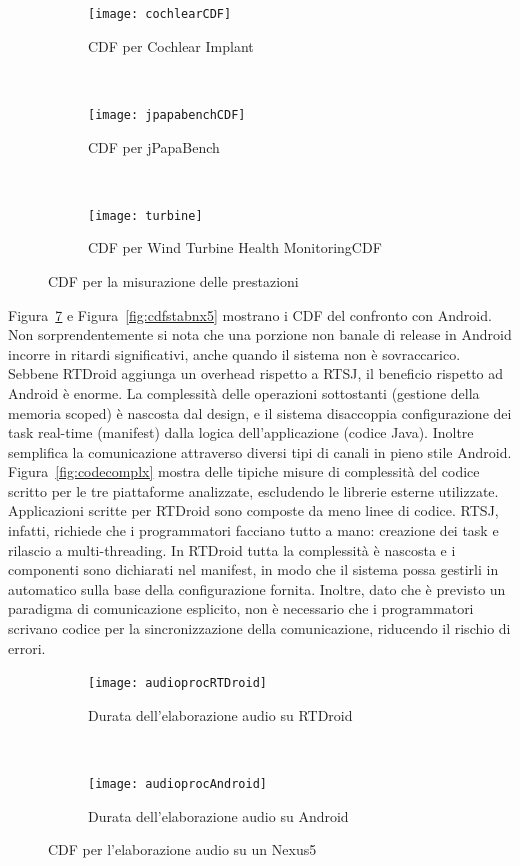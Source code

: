 \begin{figure}[h]
	\centering
	\begin{subfigure}[b]{0.3\textwidth}
		\texttt{[image: cochlearCDF]}
		\caption{CDF per Cochlear Implant}
		\label{fig:cochlearcdf}
	\end{subfigure}
	~ 
	\begin{subfigure}[b]{0.3\textwidth}
		\texttt{[image: jpapabenchCDF]}
		\caption{CDF per jPapaBench}
		\label{fig:jpapabenchcdf}
	\end{subfigure}
	~
	\begin{subfigure}[b]{0.3\textwidth}
		\texttt{[image: turbine]}
		\caption{CDF per Wind Turbine Health MonitoringCDF}
		\label{fig:turbinecdf}
	\end{subfigure}
	\caption{CDF per la misurazione delle prestazioni}\label{fig:cdfappperformance}
\end{figure}

Figura~\ref{fig:cdfaudionx5} e Figura~\ref{fig:cdfstabnx5} mostrano i CDF del confronto con Android. Non sorprendentemente si nota che una porzione non banale di release in Android incorre in ritardi significativi, anche quando il sistema non è sovraccarico. Sebbene RTDroid aggiunga un overhead rispetto a RTSJ, il beneficio rispetto ad Android è enorme. La complessità delle operazioni sottostanti (gestione della memoria scoped) è nascosta dal design, e il sistema disaccoppia configurazione dei task real-time (manifest) dalla logica dell'applicazione (codice Java). Inoltre semplifica la comunicazione attraverso diversi tipi di canali in pieno stile Android. Figura~\ref{fig:codecomplx} mostra delle tipiche misure di complessità del codice scritto per le tre piattaforme analizzate, escludendo le librerie esterne utilizzate. Applicazioni scritte per RTDroid sono composte da meno linee di codice. RTSJ, infatti, richiede che i programmatori facciano tutto a mano: creazione dei task e rilascio a multi-threading. In RTDroid tutta la complessità è nascosta e i componenti sono dichiarati nel manifest, in modo che il sistema possa gestirli in automatico sulla base della configurazione fornita. Inoltre, dato che è previsto un paradigma di comunicazione esplicito, non è necessario che i programmatori scrivano codice per la sincronizzazione della comunicazione, riducendo il rischio di errori.

\begin{figure}[h]
	\centering
	\begin{subfigure}[b]{0.45\textwidth}
		\texttt{[image: audioprocRTDroid]}
		\caption{Durata dell'elaborazione audio su RTDroid}
		\label{fig:cochlearAudioprocRT}
	\end{subfigure}
	~ 
	\begin{subfigure}[b]{0.45\textwidth}
		\texttt{[image: audioprocAndroid]}
		\caption{Durata dell'elaborazione audio su Android}
		\label{fig:cochlearAudioprocAN}
	\end{subfigure}
	\caption{CDF per l'elaborazione audio su un Nexus5}\label{fig:cdfaudionx5}
\end{figure}

